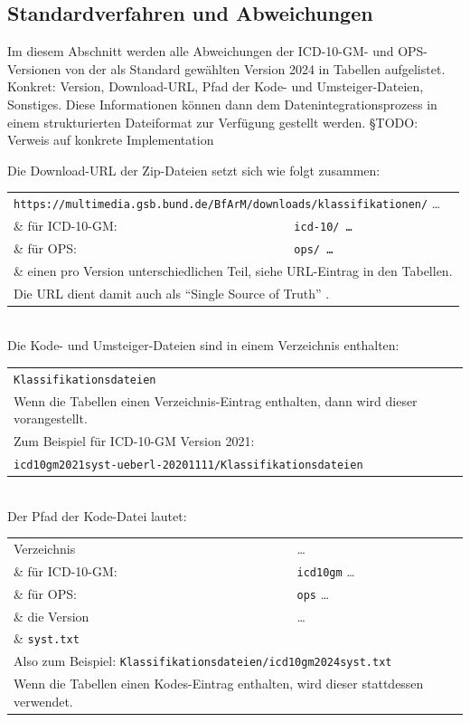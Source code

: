 \subsection{Standardverfahren und Abweichungen}

Im diesem Abschnitt werden alle Abweichungen der ICD-10-GM- und OPS-Versionen von der als Standard gewählten Version 2024 in Tabellen aufgelistet. Konkret: Version, Download-URL, Pfad der Kode- und Umsteiger-Dateien, Sonstiges. Diese Informationen können dann dem Datenintegrationsprozess in einem strukturierten Dateiformat zur Verfügung gestellt werden. §TODO: Verweis auf konkrete Implementation

Die Download-URL der Zip-Dateien setzt sich wie folgt zusammen:

\begingroup
\renewcommand{\arraystretch}{1.0}
\begin{tabular}{p{4cm}l}
\multicolumn{2}{l}{\texttt{https://multimedia.gsb.bund.de/BfArM/downloads/klassifikationen/} \ldots} \\
\& für ICD-10-GM: & \texttt{icd-10/ \ldots} \\
\& für OPS: & \texttt{ops/ \ldots} \\
\multicolumn{2}{l}{\& einen pro Version unterschiedlichen Teil, siehe URL-Eintrag in den Tabellen.} \\
\multicolumn{2}{l}{Die URL dient damit auch als ``Single Source of Truth'' \citep[Seite 257]{bonnefoy2024definitive}.} \\
\end{tabular}
\endgroup \\

Die Kode- und Umsteiger-Dateien sind in einem Verzeichnis enthalten:

\begingroup
\renewcommand{\arraystretch}{1.0}
\begin{tabular}{l}
\texttt{Klassifikationsdateien} \\
Wenn die Tabellen einen Verzeichnis-Eintrag enthalten, dann wird dieser vorangestellt. \\
Zum Beispiel für ICD-10-GM Version 2021: \\
\texttt{icd10gm2021syst-ueberl-20201111/Klassifikationsdateien} \\
\end{tabular}
\endgroup \\

Der Pfad der Kode-Datei lautet:

\begingroup
\renewcommand{\arraystretch}{1.0}
\begin{tabular}{p{4cm}l}
Verzeichnis & \ldots \\
\& für ICD-10-GM: & \texttt{icd10gm} \ldots \\
\& für OPS: & \texttt{ops} \ldots \\
\& die Version & \ldots\\
\& \texttt{syst.txt} \\
\multicolumn{2}{l}{Also zum Beispiel: \texttt{Klassifikationsdateien/icd10gm2024syst.txt}} \\
\multicolumn{2}{l}{Wenn die Tabellen einen Kodes-Eintrag enthalten, wird dieser stattdessen verwendet.} \\
\end{tabular}
\endgroup \\


